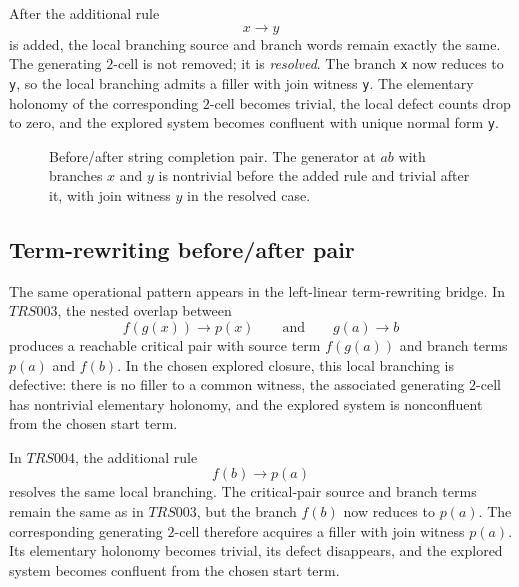 \documentclass[11pt]{article}
\numberwithin{equation}{section}
\theoremstyle{definition}
\theoremstyle{remark}
\begin{document}
After the additional rule
\[
x \to y
\]
is added, the local branching source and branch words remain exactly the same. The generating $2$-cell is not removed; it is \emph{resolved}. The branch \texttt{x} now reduces to \texttt{y}, so the local branching admits a filler with join witness \texttt{y}. The elementary holonomy of the corresponding $2$-cell becomes trivial, the local defect counts drop to zero, and the explored system becomes confluent with unique normal form \texttt{y}.

\begin{figure}[t]
    \centering
    \caption{Before/after string completion pair. The generator at $ab$ with branches $x$ and $y$ is nontrivial before the added rule and trivial after it, with join witness $y$ in the resolved case.}
    \label{fig:string-completion-before-after}
\end{figure}

\subsection{Term-rewriting before/after pair}
\label{subsec:trs-completion-holonomy}

The same operational pattern appears in the left-linear term-rewriting bridge. In $TRS003$, the nested overlap between
\[
f(g(x)) \to p(x)
\qquad\text{and}\qquad
g(a) \to b
\]
produces a reachable critical pair with source term $f(g(a))$ and branch terms $p(a)$ and $f(b)$. In the chosen explored closure, this local branching is defective: there is no filler to a common witness, the associated generating $2$-cell has nontrivial elementary holonomy, and the explored system is nonconfluent from the chosen start term.

In $TRS004$, the additional rule
\[
f(b) \to p(a)
\]
resolves the same local branching. The critical-pair source and branch terms remain the same as in $TRS003$, but the branch $f(b)$ now reduces to $p(a)$. The corresponding generating $2$-cell therefore acquires a filler with join witness $p(a)$. Its elementary holonomy becomes trivial, its defect disappears, and the explored system becomes confluent from the chosen start term.
\end{document}
